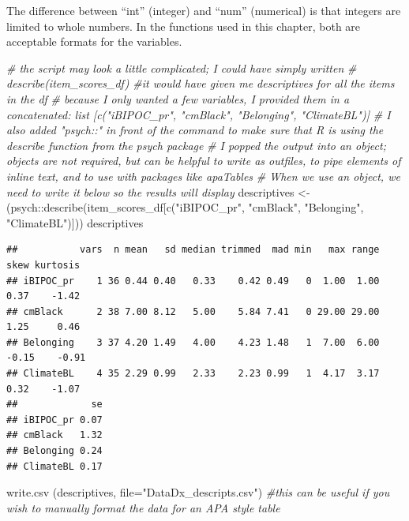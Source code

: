 \documentclass[
  english,
]{book}
\newenvironment{Shaded}{\begin{snugshade}}{\end{snugshade}}
\newcommand{\AttributeTok}[1]{\textcolor[rgb]{0.77,0.63,0.00}{#1}}
\newcommand{\CommentTok}[1]{\textcolor[rgb]{0.56,0.35,0.01}{\textit{#1}}}
\newcommand{\FunctionTok}[1]{\textcolor[rgb]{0.00,0.00,0.00}{#1}}
\newcommand{\NormalTok}[1]{#1}
\newcommand{\OtherTok}[1]{\textcolor[rgb]{0.56,0.35,0.01}{#1}}
\newcommand{\SpecialCharTok}[1]{\textcolor[rgb]{0.00,0.00,0.00}{#1}}
\newcommand{\StringTok}[1]{\textcolor[rgb]{0.31,0.60,0.02}{#1}}
\begin{document}
The difference between ``int'' (integer) and ``num'' (numerical) is that integers are limited to whole numbers. In the functions used in this chapter, both are acceptable formats for the variables.

\begin{Shaded}
\begin{Highlighting}[]
\CommentTok{\# the script may look a little complicated; I could have simply written}
\CommentTok{\# describe(item\_scores\_df) \#it would have given me descriptives for all the items in the df}
\CommentTok{\# because I only wanted a few variables, I provided them in a concatenated: list [c("iBIPOC\_pr", "cmBlack", "Belonging", "ClimateBL")]}
\CommentTok{\# I also added "psych::" in front of the command to make sure that R is using the describe function from the psych package}
\CommentTok{\# I popped the output into an object; objects are not required, but can be helpful to write as outfiles, to pipe elements of inline text, and to use with packages like apaTables}
\CommentTok{\# When we use an object, we need to write it below so the results will display}
\NormalTok{descriptives }\OtherTok{\textless{}{-}}\NormalTok{ (psych}\SpecialCharTok{::}\FunctionTok{describe}\NormalTok{(item\_scores\_df[}\FunctionTok{c}\NormalTok{(}\StringTok{"iBIPOC\_pr"}\NormalTok{, }\StringTok{"cmBlack"}\NormalTok{, }\StringTok{"Belonging"}\NormalTok{, }\StringTok{"ClimateBL"}\NormalTok{)]))}
\NormalTok{descriptives}
\end{Highlighting}
\end{Shaded}

\begin{verbatim}
##           vars  n mean   sd median trimmed  mad min   max range  skew kurtosis
## iBIPOC_pr    1 36 0.44 0.40   0.33    0.42 0.49   0  1.00  1.00  0.37    -1.42
## cmBlack      2 38 7.00 8.12   5.00    5.84 7.41   0 29.00 29.00  1.25     0.46
## Belonging    3 37 4.20 1.49   4.00    4.23 1.48   1  7.00  6.00 -0.15    -0.91
## ClimateBL    4 35 2.29 0.99   2.33    2.23 0.99   1  4.17  3.17  0.32    -1.07
##             se
## iBIPOC_pr 0.07
## cmBlack   1.32
## Belonging 0.24
## ClimateBL 0.17
\end{verbatim}

\begin{Shaded}
\begin{Highlighting}[]
\FunctionTok{write.csv}\NormalTok{ (descriptives, }\AttributeTok{file=}\StringTok{"DataDx\_descripts.csv"}\NormalTok{) }\CommentTok{\#this can be useful if you wish to manually format the data for an APA style table}
\end{Highlighting}
\end{Shaded}
\end{document}

